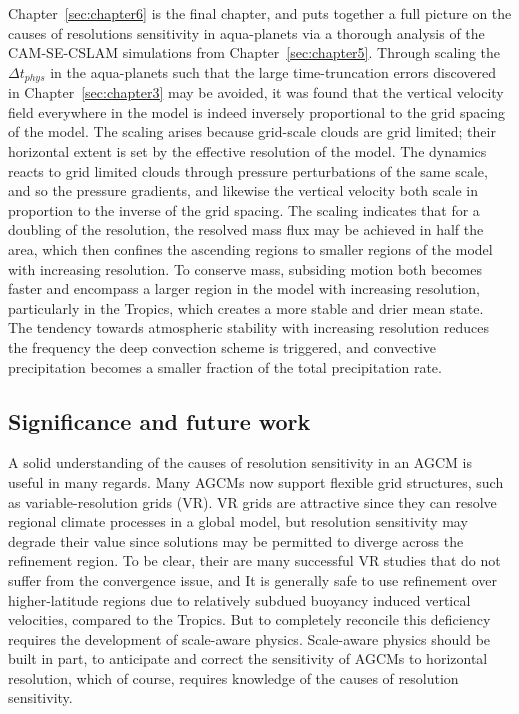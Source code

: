 Chapter~\ref{sec:chapter6} is the final chapter, and puts together a full picture on the causes of resolutions sensitivity in aqua-planets via a thorough analysis of the CAM-SE-CSLAM simulations from Chapter~\ref{sec:chapter5}. Through scaling the $\Delta t_{phys}$ in the aqua-planets such that the large time-truncation errors discovered in Chapter~\ref{sec:chapter3} may be avoided, it was found that the vertical velocity field everywhere in the model is indeed inversely proportional to the grid spacing of the model. The scaling arises because grid-scale clouds are grid limited; their horizontal extent is set by the effective resolution of the model. The dynamics reacts to grid limited clouds through pressure perturbations of the same scale, and so the pressure gradients, and likewise the vertical velocity both scale in proportion to the inverse of the grid spacing. The scaling indicates that for a doubling of the resolution, the resolved mass flux may be achieved in half the area, which then confines the ascending regions to smaller regions of the model with increasing resolution. To conserve mass, subsiding motion both becomes faster and encompass a larger region in the model with increasing resolution, particularly in the Tropics, which creates a more stable and drier mean state. The tendency towards atmospheric stability with increasing resolution reduces the frequency the deep convection scheme is triggered, and convective precipitation becomes a smaller fraction of the total precipitation rate.

\subsection{Significance and future work}

A solid understanding of the causes of resolution sensitivity in an AGCM is useful in many regards. Many AGCMs now support flexible grid structures, such as variable-resolution grids (VR). VR grids are attractive since they can resolve regional climate processes in a global model, but resolution sensitivity may degrade their value since solutions may be permitted to diverge across the refinement region. To be clear, their are many successful VR studies that do not suffer from the convergence issue, and It is generally safe to use refinement over higher-latitude regions due to relatively subdued buoyancy induced vertical velocities, compared to the Tropics. But to completely reconcile this deficiency requires the development of scale-aware physics. Scale-aware physics should be built in part, to anticipate and correct the sensitivity of AGCMs to horizontal resolution, which of course, requires knowledge of the causes of resolution sensitivity.

